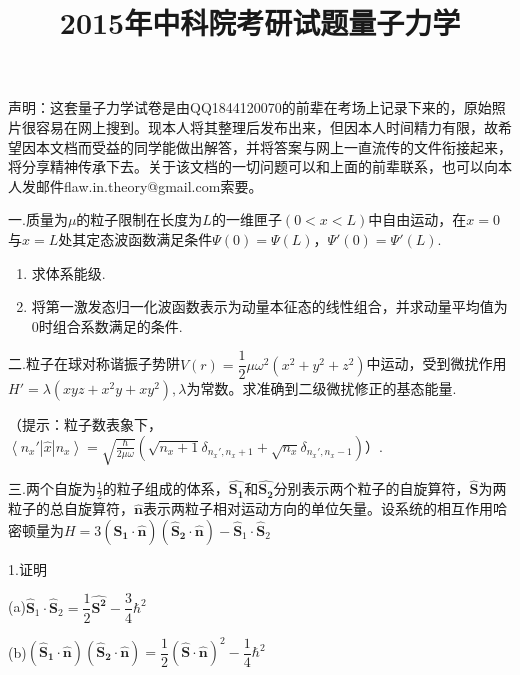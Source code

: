 \documentclass[UTF8]{ctexart}
\author{}
\date{}
\begin{document}
\title{2015年中科院考研试题量子力学}

\maketitle

声明：这套量子力学试卷是由QQ1844120070的前辈在考场上记录下来的，原始照片很容易在网上搜到。现本人将其整理后发布出来，但因本人时间精力有限，故希望因本文档而受益的同学能做出解答，并将答案与网上一直流传的文件衔接起来，将分享精神传承下去。关于该文档的一切问题可以和上面的前辈联系，也可以向本人发邮件flaw.in.theory@gmail.com索要。


一.质量为$\mu$的粒子限制在长度为$L$的一维匣子$(0<x<L)$中自由运动，在$x=0$与$x=L$处其定态波函数满足条件$\Psi(0)=\Psi(L)$，$\Psi'(0)=\Psi'(L)$.
\begin{enumerate}
\item 求体系能级.
\item 将第一激发态归一化波函数表示为动量本征态的线性组合，并求动量平均值为$0$时组合系数满足的条件.
\end{enumerate}

二.粒子在球对称谐振子势阱$V\left(r\right)=\dfrac{1}{2}\mu\omega^{2}\left(x^{2}+y^{2}+z^{2}\right)$中运动，受到微扰作用$H'=\lambda\left(xyz+x^{2}y+xy^{2}\right),\lambda$为常数。求准确到二级微扰修正的基态能量.

（提示：粒子数表象下，$\left\langle n_{x}'\left|\hat{x}\right|n_{x}\right\rangle =\sqrt{\frac{\hbar}{2\mu\omega}}\left(\sqrt{n_{x}+1}\delta_{n_{x}',n_{x}+1}+\sqrt{n_{x}}\delta_{n_{x}',n_{x}-1}\right)$）.


三.两个自旋为$\frac{1}{2}$的粒子组成的体系，$\boldsymbol{\hat{S_{1}}}$和$\boldsymbol{\hat{S_{2}}}$分别表示两个粒子的自旋算符，$\boldsymbol{\hat{S}}$为两粒子的总自旋算符，$\boldsymbol{\hat{\boldsymbol{n}}}$表示两粒子相对运动方向的单位矢量。设系统的相互作用哈密顿量为$H=3\left(\boldsymbol{\hat{S}_{1}}\cdot\boldsymbol{\hat{\boldsymbol{n}}}\right)\left(\boldsymbol{\hat{S}_{2}}\cdot\boldsymbol{\hat{\boldsymbol{n}}}\right)-\boldsymbol{\hat{S}}_{1}\cdot\boldsymbol{\hat{S}}_{2}$

1.证明

(a)$\boldsymbol{\hat{S}}_{1}\cdot\boldsymbol{\hat{S}}_{2}=\dfrac{1}{2}\boldsymbol{\hat{S^{2}}}-\dfrac{3}{4}\hbar^{2}$

(b)$\left(\boldsymbol{\hat{S}_{1}}\cdot\boldsymbol{\hat{\boldsymbol{n}}}\right)\left(\boldsymbol{\hat{S}_{2}}\cdot\boldsymbol{\hat{\boldsymbol{n}}}\right)=\dfrac{1}{2}\left(\boldsymbol{\hat{S}}\cdot\boldsymbol{\hat{n}}\right)^{2}-\dfrac{1}{4}\hbar^{2}$
\end{document}
